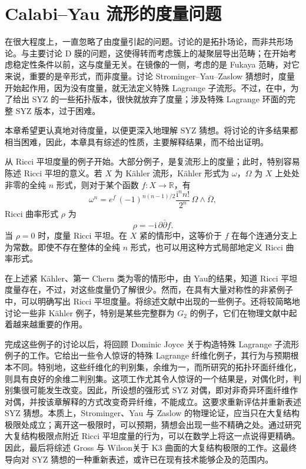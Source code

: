 \chapter{Calabi--Yau 流形的度量问题}\label{chap:7}

在很大程度上，一直忽略了由度量引起的问题。讨论的是拓扑场论，而非共形场论。与主要讨论 D 膜的问题，这使得转而考虑簇上的凝聚层导出范畴；在开始考虑稳定性条件以前，这与度量无关。在镜像的一侧，考虑的是 Fukaya 范畴，对它来说，重要的是辛形式，而非度量。讨论 Strominger--Yau--Zaslow 猜想时，度量开始起作用，因为没有度量，就无法定义特殊 Lagrange 子流形。不过，在中，为了给出 SYZ 的一些拓扑版本，很快就放弃了度量；涉及特殊 Lagrange 环面的完整 SYZ 版本，过于困难。

本章希望更认真地对待度量，以便更深入地理解 SYZ 猜想。将讨论的许多结果都相当困难，因此，本章具有综述的性质，主要解释结果，而不给出证明。

从 Ricci 平坦度量的例子开始。大部分例子，是复流形上的度量；此时，特别容易陈述 Ricci 平坦的意义。若 $X$ 为 Kähler 流形，Kähler 形式为 $\omega$，$\Omega$ 为 $X$ 上处处非零的全纯 $n$ 形式，则对于某个函数 $f\colon X\to\mathbb R$，有
\[
\omega^n=e^f\,(-1)^{n(n-1)/2}\frac{\mathrm i^n n!}{2^n}\,
\Omega\wedge\overline\Omega,
\]
Ricci 曲率形式 $\rho$ 为
\[
\rho=-\mathrm i\,\partial\bar\partial f.
\]
当 $\rho=0$ 时，度量 Ricci 平坦。在 $X$ 紧的情形中，这等价于 $f$ 在每个连通分支上为常数。即使不存在整体的全纯 $n$ 形式，也可以用这种方式局部地定义 Ricci 曲率形式。

在上述紧 Kähler、第一 Chern 类为零的情形中，由 Yau的结果，知道 Ricci 平坦度量存在，不过，对这些度量仍了解很少。然而，在具有大量对称性的非紧例子中，可以明确写出 Ricci 平坦度量。将综述文献中出现的一些例子。还将较简略地讨论一些非 Kähler 例子，特别是某些完整群为 $G_2$ 的例子，它们在物理文献中起着越来越重要的作用。

完成这些例子的讨论以后，将回顾 Dominic Joyce 关于构造特殊 Lagrange 子流形例子的工作。它给出一些令人惊讶的特殊 Lagrange 纤维化例子，其行为与预期根本不同。特别地，这些纤维化的判别集，余维为一，而所研究的拓扑环面纤维化，则具有良好的余维二判别集。这项工作尤其令人惊讶的一个结果是，对偶化时，判别集很可能发生改变。因此，所设想的强形式 SYZ 对偶，即对非奇异环面纤维作对偶，并按该章解释的方式改变奇异纤维，不能成立。这要求重新评估并重新表述 SYZ 猜想。本质上，Strominger、Yau 与 Zaslow 的物理论证，应当只在大复结构极限处成立；离开这一极限时，可以预期，猜想会出现一些不精确之处。通过研究大复结构极限点附近 Ricci 平坦度量的行为，可以在数学上将这一点说得更精确。因此，最后将综述 Gross 与 Wilson关于 K3 曲面的大复结构极限的工作。这最终导向对 SYZ 猜想的一种重新表述，或许已在现有技术能够企及的范围内。

